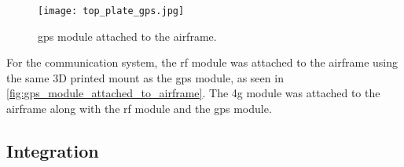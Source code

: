 \begin{figure}
  \texttt{[image: top\_plate\_gps.jpg]}
  \caption{\gls{gps} module attached to the airframe.}\label{fig:gps_attached_to_airframe}
\end{figure}

For the communication system, the \gls{rf} module was attached to the airframe using the same 3D printed mount as the \gls{gps} module, as seen in \cref{fig:gps_module_attached_to_airframe}. The \gls{4g} module was attached to the airframe along with the \gls{rf} module and the \gls{gps} module.

\subsection{Integration}\label{subsec:implementation_integration}

